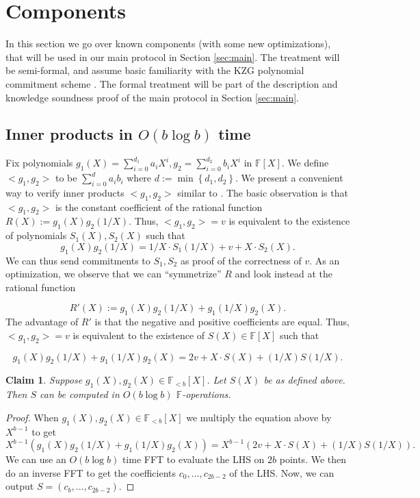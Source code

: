 \documentclass[11pt]{article} %
\newcommand{\F}{\ensuremath{\mathbb F}\xspace}
\newcommand{\defeq}{:=}
\newcommand{\set}[1]{\ensuremath{\left\{#1\right\}}\xspace}
\newcommand{\polysofdeg}[1]{\ensuremath{\F_{< #1}[X]}\xspace}
\newcommand{\polys}{\ensuremath{\F[X]}\xspace}
\newtheorem{claim}[lemma]{Claim}
\begin{document}
\section{Components}\label{sec:components}
In this section we go over known components (with some new optimizations), that will be used in our main protocol in Section \ref{sec:main}. The treatment will  be  semi-formal, and assume basic familiarity with the KZG polynomial commitment scheme \cite{kzg}. The formal treatment will be part of the description and knowledge soundness proof of the main protocol in Section \ref{sec:main}.
\subsection{Inner products in $O(b\log b)$ time}
Fix polynomials $g_1(X)=\sum_{i=0}^{d_1} a_i X^i,g_2=\sum_{i=0}^{d_2} b_i X^i$ in $\polys$.
We define $<g_1,g_2>$ to be $\sum_{i=0}^d a_i b_i$ where $d\defeq \min \set{d_1,d_2}$. 
We present a convenient way to verify inner products $<g_1,g_2>$ similar to \cite{bootle,sonic}.
The basic observation is that  $<g_1,g_2>$ is the constant coefficient of the rational function
$R(X)\defeq g_1(X) g_2(1/X)$.
Thus, $<g_1,g_2>=v$ is equivalent to the existence of polynomials $S_1(X),S_2(X)$ such that
\[g_1(X) g_2(1/X)=1/X\cdot S_1(1/X) + v + X\cdot S_2(X).\] 
We can thus send commitments to $S_1,S_2$ as proof of the correctness of $v$.
As an optimization, we observe that we can ``symmetrize'' $R$ and look instead at the rational function

\[R'(X)\defeq g_1(X) g_2(1/X)+g_1(1/X) g_2(X).\]
The advantage of $R'$ is that the negative and positive coefficients are equal. Thus,
$<g_1,g_2>=v$ is equivalent to the existence of $S(X)\in \polys$ such that

\[ g_1(X) g_2(1/X)+g_1(1/X) g_2(X)=2v + X\cdot S(X) + (1/X)S(1/X).\]

\begin{claim}\label{clm:computeS}
 Suppose $g_1(X),g_2(X)\in \polysofdeg{b}$. Let $S(X)$ be as defined above.
 Then $S$ can be computed in $O(b \log b)$ \F-operations.
\end{claim}
\begin{proof}
When $g_1(X),g_2(X)\in \polysofdeg{b}$ we multiply the equation above by $X^{b-1}$ to get
\[ X^{b-1}(g_1(X) g_2(1/X)+g_1(1/X) g_2(X))=X^{b-1}(2v + X\cdot S(X) + (1/X)S(1/X)).\]
We can use an $O(b \log b )$ time FFT to evaluate the LHS on $2b$ points. We then do an inverse
FFT to get the coefficients $c_0,\ldots,c_{2b-2}$ of the LHS. Now, we can output $S=(c_b,\ldots, c_{2b-2})$.
\end{proof}
\end{document}
